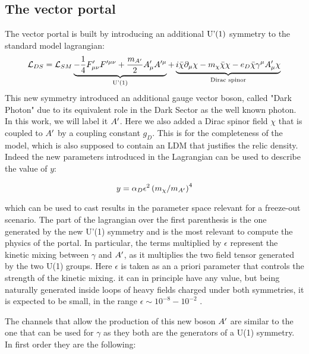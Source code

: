 \subsection{The vector portal}
\label{ch1:sec:dm-colliders}

The vector portal is built by introducing an additional $\textrm{U'(1)}$ symmetry to the standard model lagrangian:
\begin{equation}
  \label{eq:dm-lagrangian}
  \mathcal{L}_{DS} = \mathcal{L}_{SM} \underbrace{- \frac{1}{4}F'_{\mu \nu}F'^{\mu \nu} + \frac{m_{A'}}{2}A'_{\mu}A'^{\mu}}_{\textrm{U'(1)}} + \underbrace{i \bar{\chi} \partial_{\mu} \chi - m_{\chi}\bar{\chi}\chi - e_D \bar{\chi}\gamma^{\mu}A'_{\mu}\chi}_{\textrm{Dirac spinor}}
\end{equation}
This new symmetry introduced an additional gauge vector boson, called "Dark Photon" due to its equivalent role in the Dark Sector as the well known photon. In this work, we will label it $A'$. Here we also added a Dirac spinor field $\chi$ that is coupled to $A'$ by a coupling constant $g_D$. This is for the completeness of the model, which is also supposed to contain an LDM that justifies the relic density. Indeed the new parameters introduced in the Lagrangian can be used to describe the value of $y$:

    \begin{equation}
      \label{eq:dmplane-y-dp}
      y = \alpha_D \epsilon^2 \left(m_{\chi}/ m_{A'} \right)^4 
    \end{equation}

which can be used to cast results in the parameter space relevant for a freeze-out scenario.
The part of the lagrangian over the first parenthesis is the one generated by the new U'(1) symmetry and is the most relevant to compute the physics of the portal. In particular, the terms multiplied by $\epsilon$ represent the kinetic mixing between $\gamma$ and $A'$, as it multiplies the two field tensor generated by the two U(1) groups. Here $\epsilon$ is taken as an a priori parameter that controls the strength of the kinetic mixing. it can in principle have any value, but being naturally generated inside loops of heavy fields charged under both symmetries, it is expected to be small, in the range $\epsilon \sim 10^{-8} - 10^{-2}$ \cite{jdb}. 

The channels that allow the production of this new boson $A'$ are similar to the one that can be used for $\gamma$ as they both are the generators of a U(1) symmetry. In first order they are the following:

